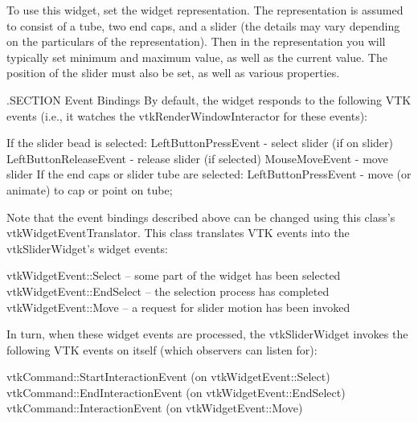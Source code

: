 To use this widget, set the widget representation. The representation is assumed to consist of a tube, two end caps, and a slider (the details may vary depending on the particulars of the representation). Then in the representation you will typically set minimum and maximum value, as well as the current value. The position of the slider must also be set, as well as various properties.

.S\-E\-C\-T\-I\-O\-N Event Bindings By default, the widget responds to the following V\-T\-K events (i.\-e., it watches the vtk\-Render\-Window\-Interactor for these events)\-: 
\begin{DoxyPre}
 If the slider bead is selected:
   LeftButtonPressEvent - select slider (if on slider)
   LeftButtonReleaseEvent - release slider (if selected)
   MouseMoveEvent - move slider
 If the end caps or slider tube are selected:
   LeftButtonPressEvent - move (or animate) to cap or point on tube;
 \end{DoxyPre}


Note that the event bindings described above can be changed using this class's vtk\-Widget\-Event\-Translator. This class translates V\-T\-K events into the vtk\-Slider\-Widget's widget events\-: 
\begin{DoxyPre}
   vtkWidgetEvent::Select -- some part of the widget has been selected
   vtkWidgetEvent::EndSelect -- the selection process has completed
   vtkWidgetEvent::Move -- a request for slider motion has been invoked
 \end{DoxyPre}


In turn, when these widget events are processed, the vtk\-Slider\-Widget invokes the following V\-T\-K events on itself (which observers can listen for)\-: 
\begin{DoxyPre}
   vtkCommand::StartInteractionEvent (on vtkWidgetEvent::Select)
   vtkCommand::EndInteractionEvent (on vtkWidgetEvent::EndSelect)
   vtkCommand::InteractionEvent (on vtkWidgetEvent::Move)
 \end{DoxyPre}


